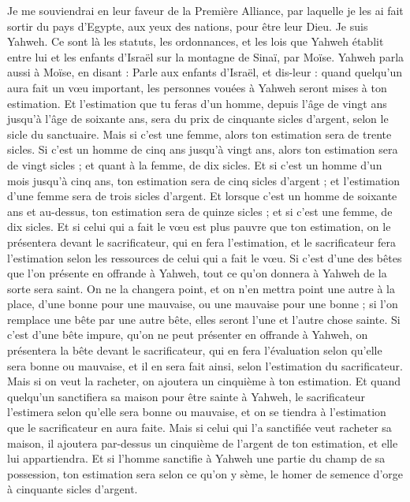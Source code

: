 \begin{multicols}{2}
Je me souviendrai en leur faveur de la Première Alliance, par laquelle je les ai fait sortir du pays d'Egypte, aux yeux des nations, pour être leur Dieu. Je suis Yahweh.
Ce sont là les statuts, les ordonnances, et les lois que Yahweh établit entre lui et les enfants d'Israël sur la montagne de Sinaï, par Moïse.
\VerseOne{}Yahweh parla aussi à Moïse, en disant :
Parle aux enfants d'Israël, et dis-leur : quand quelqu'un aura fait un vœu important, les personnes vouées à Yahweh seront mises à ton estimation.
Et l'estimation que tu feras d'un homme, depuis l'âge de vingt ans jusqu'à l'âge de soixante ans, sera du prix de cinquante sicles d'argent, selon le sicle du sanctuaire.
Mais si c'est une femme, alors ton estimation sera de trente sicles.
Si c'est un homme de cinq ans jusqu'à vingt ans, alors ton estimation sera de vingt sicles ; et quant à la femme, de dix sicles.
Et si c'est un homme d'un mois jusqu'à cinq ans, ton estimation sera de cinq sicles d'argent ; et l'estimation d'une femme sera de trois sicles d'argent.
Et lorsque c'est un homme de soixante ans et au-dessus, ton estimation sera de quinze sicles ; et si c'est une femme, de dix sicles.
Et si celui qui a fait le vœu est plus pauvre que ton estimation, on le présentera devant le sacrificateur, qui en fera l'estimation, et le sacrificateur fera l'estimation selon les ressources de celui qui a fait le vœu.
Si c'est d'une des bêtes que l'on présente en offrande à Yahweh, tout ce qu'on donnera à Yahweh de la sorte sera saint.
On ne la changera point, et on n'en mettra point une autre à la place, d'une bonne pour une mauvaise, ou une mauvaise pour une bonne ; si l'on remplace une bête par une autre bête, elles seront l'une et l'autre chose sainte.
Si c'est d'une bête impure, qu'on ne peut présenter en offrande à Yahweh, on présentera la bête devant le sacrificateur,
qui en fera l'évaluation selon qu'elle sera bonne ou mauvaise, et il en sera fait ainsi, selon l'estimation du sacrificateur.
Mais si on veut la racheter, on ajoutera un cinquième à ton estimation.
Et quand quelqu'un sanctifiera sa maison pour être sainte à Yahweh, le sacrificateur l'estimera selon qu'elle sera bonne ou mauvaise, et on se tiendra à l'estimation que le sacrificateur en aura faite.
Mais si celui qui l'a sanctifiée veut racheter sa maison, il ajoutera par-dessus un cinquième de l'argent de ton estimation, et elle lui appartiendra.
Et si l'homme sanctifie à Yahweh une partie du champ de sa possession, ton estimation sera selon ce qu'on y sème, le homer de semence d'orge à cinquante sicles d'argent.

\end{multicols}
